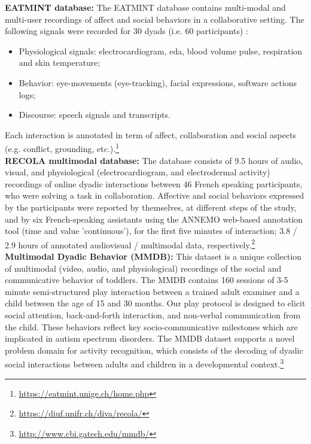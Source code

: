\textbf{EATMINT database: }
The EATMINT database contains multi-modal and multi-user recordings of affect and social behaviors in a collaborative setting. The following signals were recorded for 30 dyads (i.e. 60 participants) :
\begin{itemize}
\item Physiological signals: electrocardiogram, \gls{eda}, blood volume pulse, respiration and skin temperature;
\item Behavior: eye-movements (eye-tracking), facial expressions, software actions logs;
\item Discourse: speech signals and transcripts.
\end{itemize}
Each interaction is annotated in term of affect, collaboration and social aspects (e.g. conflict, grounding, etc.).\footnote{\url{https://eatmint.unige.ch/home.php}}\\

\textbf{RECOLA multimodal database:} The database consists of 9.5 hours of audio, visual, and physiological (electrocardiogram, and electrodermal activity) recordings of online dyadic interactions between 46 French speaking participants, who were solving a task in collaboration. Affective and social behaviors expressed by the participants were reported by themselves, at different steps of the study, and by six French-speaking assistants using the ANNEMO web-based annotation tool (time and value 'continuous'), for the first five minutes of interaction; 3.8 / 2.9 hours of annotated audiovisual / multimodal data, respectively.\footnote{\url{https://diuf.unifr.ch/diva/recola/}}\\

\textbf{Multimodal Dyadic Behavior (MMDB):} This dataset is a unique collection of multimodal (video, audio, and physiological) recordings of the social and communicative behavior of toddlers. The MMDB contains 160 sessions of 3-5 minute semi-structured play interaction between a trained adult examiner and a child between the age of 15 and 30 months. Our play protocol is designed to elicit social attention, back-and-forth interaction, and non-verbal communication from the child. These behaviors reflect key socio-communicative milestones which are implicated in autism spectrum disorders. The MMDB dataset supports a novel problem domain for activity recognition, which consists of the decoding of dyadic social interactions between adults and children in a developmental context.\footnote{\url{http://www.cbi.gatech.edu/mmdb/}}\\


